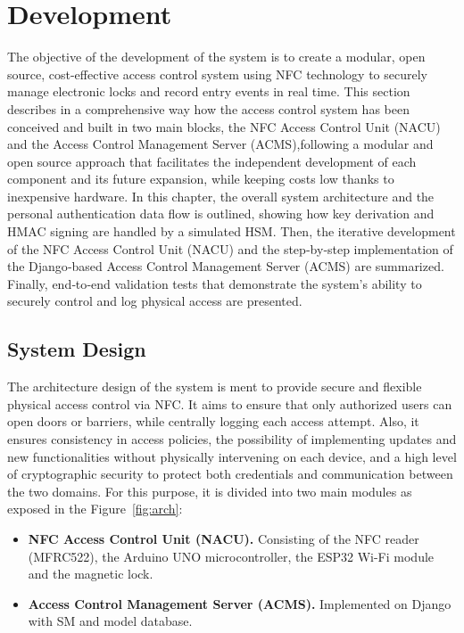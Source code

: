 \chapter{Development}

The objective of the development of the system is to create a modular, open source,
cost-effective access control system using NFC technology to securely manage
electronic locks and record entry events in real time. This section describes in a
comprehensive way how the access control system has been conceived and built in
two main blocks, the NFC Access Control Unit (NACU) and the Access Control
Management Server (ACMS),following a modular and open source approach that
facilitates the independent development of each component and its future expansion,
while keeping costs low thanks to inexpensive hardware.
In this chapter, the overall system architecture and the personal authentication data
flow is outlined, showing how key derivation and HMAC signing are handled by a
simulated HSM. Then, the iterative development of the NFC Access Control Unit
(NACU) and the step‑by‑step implementation of the Django‑based Access Control
Management Server (ACMS) are summarized. Finally, end‑to‑end validation tests
that demonstrate the system’s ability to securely control and log physical access are
presented.

\section{System Design}
\label{sec:SystemDesign}
The architecture design of the system is ment to provide secure and flexible physical
access control via NFC. It aims to ensure that only authorized users can open doors
or barriers, while centrally logging each access attempt. Also, it ensures consistency
in access policies, the possibility of implementing updates and new functionalities
without physically intervening on each device, and a high level of cryptographic
security to protect both credentials and communication between the two domains.
For this purpose, it is divided into two main modules as exposed in the Figure~\ref{fig:arch}:

\begin{itemize}
	\item \textbf{NFC Access Control Unit (NACU).}  Consisting of the NFC reader
	(MFRC522), the Arduino UNO microcontroller, the ESP32 Wi-Fi module and
	the magnetic lock.
	\item \textbf{Access Control Management Server (ACMS).}  Implemented on Django with SM and model database.
\end{itemize}

